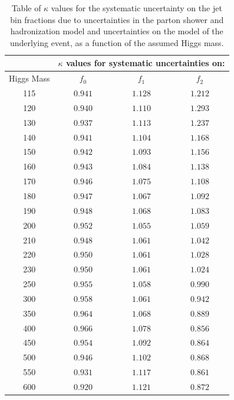 \begin{table}[!htbp]
\begin{center}
\begin{tabular}{|c|c|c|c|}

\hline
               &   \multicolumn{3}{|c|}{ $\kappa$ values for systematic uncertainties on: } \\
\hline
Higgs Mass     &   $f_{0}$   &  $f_{1}$       &   $f_{2}$       \\
\hline
115 & $0.941$ & $1.128$ & $1.212$ \\
120 & $0.940$ & $1.110$ & $1.293$ \\
130 & $0.937$ & $1.113$ & $1.237$ \\
140 & $0.941$ & $1.104$ & $1.168$ \\
150 & $0.942$ & $1.093$ & $1.156$ \\
160 & $0.943$ & $1.084$ & $1.138$ \\
170 & $0.946$ & $1.075$ & $1.108$ \\
180 & $0.947$ & $1.067$ & $1.092$ \\
190 & $0.948$ & $1.068$ & $1.083$ \\
200 & $0.952$ & $1.055$ & $1.059$ \\
210 & $0.948$ & $1.061$ & $1.042$ \\
220 & $0.950$ & $1.061$ & $1.028$ \\
230 & $0.950$ & $1.061$ & $1.024$ \\
250 & $0.955$ & $1.058$ & $0.990$ \\
300 & $0.958$ & $1.061$ & $0.942$ \\
350 & $0.964$ & $1.068$ & $0.889$ \\
400 & $0.966$ & $1.078$ & $0.856$ \\
450 & $0.954$ & $1.092$ & $0.864$ \\
500 & $0.946$ & $1.102$ & $0.868$ \\
550 & $0.931$ & $1.117$ & $0.861$ \\
600 & $0.920$ & $1.121$ & $0.872$ \\


\hline
\end{tabular}
\caption{Table of $\kappa$ values for the systematic uncertainty on the jet bin fractions
due to  uncertainties in the parton shower and hadronization model and uncertainties
on the model of the underlying event, as a function of the assumed Higgs mass.  }
\label{tab:JetBinFractionSystematics_PartonShower}
\end{center}
\end{table}



